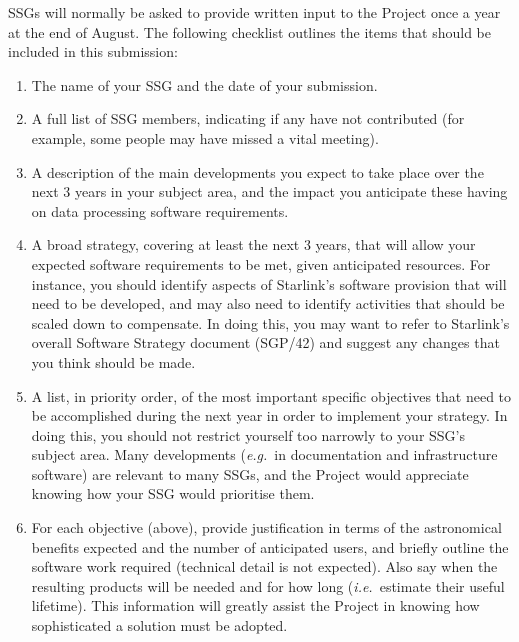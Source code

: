 \documentclass[11pt]{article}
\newcommand{\xref}[3]{#1}
\begin{document}
SSGs will normally be asked to provide written input to the Project
once a year at the end of August. The following checklist outlines the
items that should be included in this submission:

\begin{enumerate}
\item The name of your SSG and the date of your submission.

\item A full list of SSG members, indicating if any have not
contributed (for example, some people may have missed a vital
meeting).

\item A description of the main developments you expect to take place
over the next 3 years in your subject area, and the impact you
anticipate these having on data processing software requirements.

\item A broad strategy, covering at least the next 3 years, that will
allow your expected software requirements to be met, given anticipated
resources. For instance, you should identify aspects of Starlink's
software provision that will need to be developed, and may also need
to identify activities that should be scaled down to compensate. In
doing this, you may want to refer to Starlink's overall Software
Strategy document (\xref{SGP/42}{sgp42}{}) and suggest any changes
that you think should be made.

\item A list, in priority order, of the most important specific
objectives that need to be accomplished during the next year in order
to implement your strategy. In doing this, you should not restrict
yourself too narrowly to your SSG's subject area. Many developments
({\em e.g.}\ in documentation and infrastructure software) are
relevant to many SSGs, and the Project would appreciate knowing how
your SSG would prioritise them.

\item For each objective (above), provide justification in terms of
the astronomical benefits expected and the number of anticipated
users, and briefly outline the software work required (technical
detail is not expected). Also say when the resulting products will be
needed and for how long ({\em i.e.}\ estimate their useful
lifetime). This information will greatly assist the Project in knowing
how sophisticated a solution must be adopted.

\end{enumerate}
\end{document}
